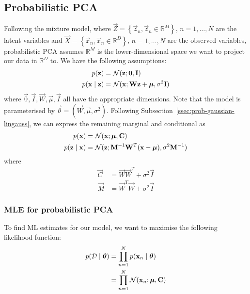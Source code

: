 \subsection{Probabilistic PCA}
Following the mixture model, where $\vec Z = \left\{\vec z_n, \vec z_n \in \mathbb R^M\right\}$, $n = 1, \dotsc, N$ are the latent variables and $\vec X = \left\{\vec x_n, \vec x_n \in \mathbb R^D\right\}$, $n = 1, \dotsc, N$ are the observed variables, probabilistic PCA assumes $\mathbb R^M$ is the lower-dimensional space we want to project our data in $\mathbb R^D$ to. We have the following assumptions:
\begin{align*}
    p(\boldsymbol{\mathbf{z}})               &= \operatorname{\mathcal N}(\boldsymbol{\mathbf{z}}; \boldsymbol{\mathbf{0}}, \boldsymbol{\mathbf{I}}) \\
    p(\boldsymbol{\mathbf{x}} \mid \boldsymbol{\mathbf{z}})   &= \operatorname{\mathcal N}(\boldsymbol{\mathbf{x}}; \boldsymbol{\mathbf{W}} \boldsymbol{\mathbf{z}} + \boldsymbol{\mathbf{\mu}}, \sigma^2 \boldsymbol{\mathbf{I}})
\end{align*}
where $\vec 0, \vec I, \vec W, \vec \mu, \vec I$ all have the appropriate dimensions. Note that the model is parameterised by $\vec \theta = \left(\vec W, \vec \mu, \sigma^2\right)$. Following Subsection~\ref{ssec:prob-gaussian-lingauss}, we can express the remaining marginal and conditional as
\begin{align*}
    p(\boldsymbol{\mathbf{x}})               &= \operatorname{\mathcal N}(\boldsymbol{\mathbf{x}}; \boldsymbol{\mathbf{\mu}}, \boldsymbol{\mathbf{C}}) \\
    p(\boldsymbol{\mathbf{z}} \mid \boldsymbol{\mathbf{x}})   &= \operatorname{\mathcal N}(\boldsymbol{\mathbf{z}}; \boldsymbol{\mathbf{M}}^{-1} \boldsymbol{\mathbf{W}}^T (\boldsymbol{\mathbf{x}} - \boldsymbol{\mathbf{\mu}}), \sigma^2 \boldsymbol{\mathbf{M}}^{-1})
\end{align*}
where
\begin{align*}
    \vec C      &= \vec W \vec W^T + \sigma^2 \vec I \\
    \vec M      &= \vec W^T \vec W + \sigma^2 \vec I
\end{align*}

\subsubsection{MLE for probabilistic PCA}
To find ML estimates for our model, we want to maximise the following likelihood function:
\begin{align*}
    p(\mathcal D \mid \boldsymbol{\mathbf{\theta}})  &= \prod_{n = 1}^N p(\boldsymbol{\mathbf{x}}_n \mid \boldsymbol{\mathbf{\theta}}) \\
                                    &= \prod_{n = 1}^N \operatorname{\mathcal N}(\boldsymbol{\mathbf{x}}_n ; \boldsymbol{\mathbf{\mu}}, \boldsymbol{\mathbf{C}})
\end{align*}

